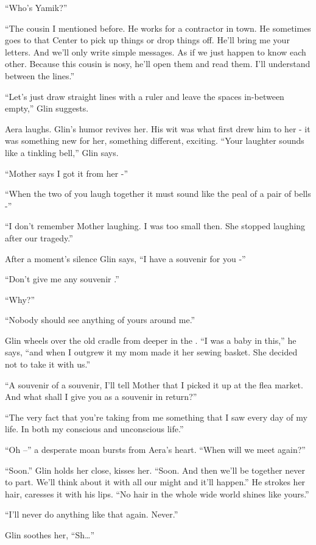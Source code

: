 \documentclass[twoside,11pt]{book}
\begin{document}
``Who's Yamik?''

``The cousin I mentioned before. He works for a contractor in town. He sometimes goes to that Center to
pick up things or drop things off.  He'll bring me your letters. And we'll only write simple messages. As if we just
happen to know each other. Because this cousin is nosy, he'll open them and read them. I'll understand between the
lines.''

``Let's just draw straight lines with a ruler and leave the spaces in-between empty,'' Glin
suggests.

Aera laughs.  Glin's humor revives her. His wit was what first drew him to her - it was something new for her, something
different, exciting. ``Your laughter sounds like a tinkling bell,'' Glin says.

``Mother says I got it from her -''

``When the two of you laugh together it must sound like the peal of a pair of bells -''

``I don't remember Mother laughing. I was too small then. She stopped laughing after our
tragedy.''

After a moment's silence Glin says, ``I have a souvenir for you -''

``Don't give me any souvenir .''

``Why?''

``Nobody should see anything of yours around me.''

Glin wheels over the old cradle from deeper in the . ``I was a baby in this,'' he says,
``and when I outgrew it my mom made it her sewing basket. She decided not to take it with
us.''

``A souvenir of a souvenir, I'll tell Mother that I picked it up at the flea market. And what shall I give
you as a souvenir in return?''

``The very fact that you're taking from me something that I saw every day of my life. In both my conscious
and unconscious life.''

``Oh --'' a desperate moan bursts from Aera's heart. ``When will we meet
again?''

``Soon.'' Glin holds her close, kisses her. ``Soon. And then we'll be together
never to part. We'll think about it with all our might and it'll happen.'' He strokes her hair, caresses
it with his lips. ``No hair in the whole wide world shines like yours.''

``I'll never do anything like that again. Never.''

Glin soothes her, ``Sh{\dots}''
\end{document}
